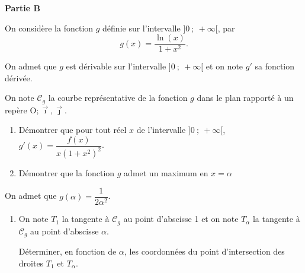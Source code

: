 \documentclass[10pt]{article}
\providecommand{\Oij}{\(\mathrm{O};\vec{\imath},\vec{\jmath}\)}
\begin{document}
\bigskip

\textbf{Partie B}

\medskip

On considère la fonction $g$ définie sur l'intervalle $]0~;~+ \infty[$, par 
\[g(x) = \dfrac{\ln (x)}{1 + x^2}.\]

On admet que $g$ est dérivable sur l'intervalle $]0~;~+ \infty[$ et on note $g'$ sa fonction dérivée.

On note $\mathcal{C}_g$ la courbe représentative de la fonction $g$ dans le plan rapporté à un repère \Oij.

\medskip

\begin{enumerate}
\item Démontrer que pour tout réel $x$ de l'intervalle $]0~;~+ \infty[$, \: $g'(x) = \dfrac{f(x)}{x\left(1 + x^2\right)^2}$.
\item Démontrer que la fonction $g$ admet un maximum en $x = \alpha$
\end{enumerate}

On admet que $g(\alpha) = \dfrac{1}{2\alpha^2}$.

\begin{enumerate}[resume]
\item On note $T_1$ la tangente à $\mathcal{C}_g$ au point d'abscisse 1 et on note $T_{\alpha}$ la tangente à $\mathcal{C}_g$ au point d'abscisse $\alpha$.

Déterminer, en fonction de $\alpha$, les coordonnées du point d'intersection des droites $T_1$ et $T_{\alpha}$.
\end{enumerate}

\bigskip
\end{document}

